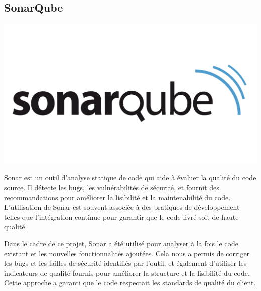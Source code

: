 \subsection*{SonarQube}
 \begin{center}
    \centering
    \includegraphics[scale=0.15]{Figures/sonarqube.png}
    \label{fig:processus}
\end{center} 

Sonar est un outil d’analyse statique de code qui aide à évaluer la qualité du code source. Il détecte les bugs, les vulnérabilités de sécurité, et fournit des recommandations pour améliorer la lisibilité et la maintenabilité du code. L'utilisation de Sonar est souvent associée à des pratiques de développement telles que l'intégration continue pour garantir que le code livré soit de haute qualité.

Dans le cadre de ce projet, Sonar a été utilisé pour analyser à la fois le code existant et les nouvelles fonctionnalités ajoutées. Cela nous a permis de corriger les bugs et les failles de sécurité identifiés par l'outil, et également d'utiliser les indicateurs de qualité fournis pour améliorer la structure et la lisibilité du code. Cette approche a garanti que le code respectait les standards de qualité du client.

